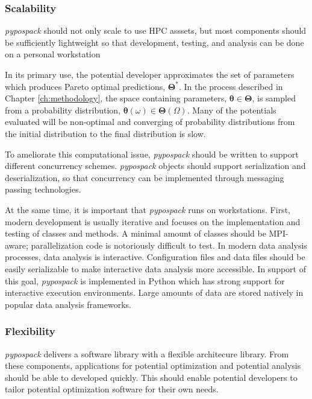 \subsubsection{Scalability}

\emph{pypospack} should not only scale to use HPC asssets, but most components should be sufficiently lightweight so that development, testing, and analysis can be done on a personal workstation

In its primary use, the potential developer approximates the set of parameters  which produces Pareto optimal predictions, $\bm{\Theta}^*$.
In the process described in Chapter \ref{ch:methodology}, the space containing parameters, $\bm{\theta} \in \bm{\Theta}$, is sampled from a probability distribution, $\bm{\theta}(\omega) \in \bm{\Theta}(\Omega)$.
Many of the potentials evaluated will be non-optimal and converging of probability distributions from the initial distribution to the final distribution is slow.

To ameliorate this computational issue, \emph{pypospack} should be written to support different concurrency schemes.  \emph{pypospack} objects should support serialization and deserialization, so that concurrency can be implemented through messaging passing technologies.

At the same time, it is important that \emph{pypospack} runs on workstations.  First, modern development is usually iterative and focuses on the implementation and testing of classes and methods.  A minimal amount of classes should be MPI-aware; parallelization code is notoriously difficult to test.
In modern data analysis processes, data analysis is interactive.  Configuration files and data files should be easily serializable to make interactive data analysis more accessible.
In support of this goal, \emph{pypospack} is implemented in Python which has strong support for interactive execution environments.  Large amounts of data are stored natively in popular data analysis frameworks.

\subsubsection{Flexibility}

\emph{pypospack} delivers a software library with a flexible architecure library.  From these components, applications for potential optimization and potential analysis should be able to developed quickly.  This should enable potential developers to tailor potential optimization software for their own needs.


